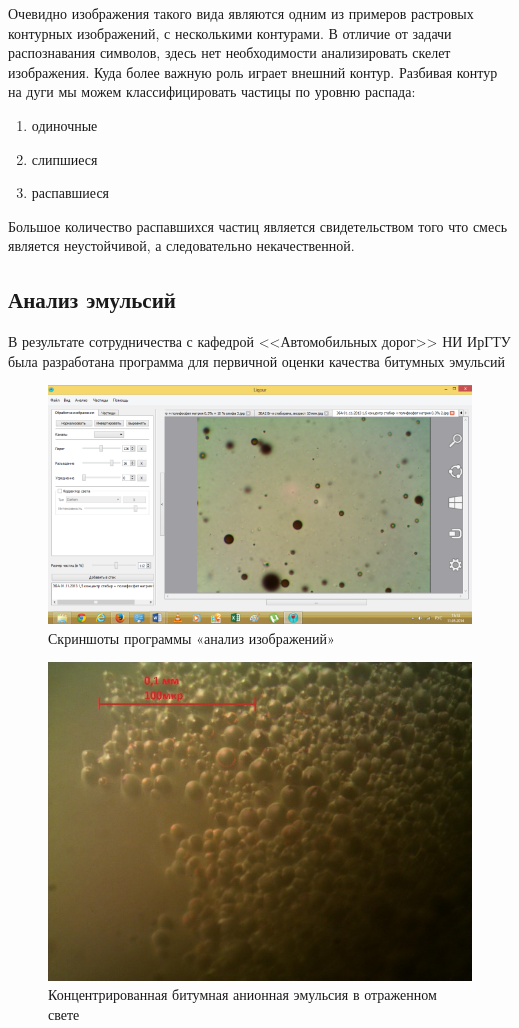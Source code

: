Очевидно изображения такого вида являются одним из примеров растровых контурных изображений, с несколькими контурами. В отличие от задачи распознавания символов, здесь нет необходимости анализировать скелет изображения. Куда более важную роль играет внешний контур. Разбивая контур на дуги мы можем классифицировать частицы по уровню распада:
\begin{enumerate}
\item одиночные
\item слипшиеся
\item распавшиеся
\end{enumerate}
Большое количество распавшихся частиц является свидетельством того что смесь является неустойчивой, а следовательно некачественной.

\subsection{Анализ эмульсий}
В результате сотрудничества с кафедрой <<Автомобильных дорог>> НИ ИрГТУ была разработана программа для первичной оценки качества битумных эмульсий

\begin{figure}[h]
	\centering
	\includegraphics{images/em_03}
	\caption{Скриншоты программы «анализ изображений»}
	\label{em_img_program}
\end{figure}

\begin{figure}[h]
	\centering
	\includegraphics{images/em_01}
	\caption{Концентрированная битумная анионная эмульсия в отраженном свете}
	\label{em_img_bad}
\end{figure}

